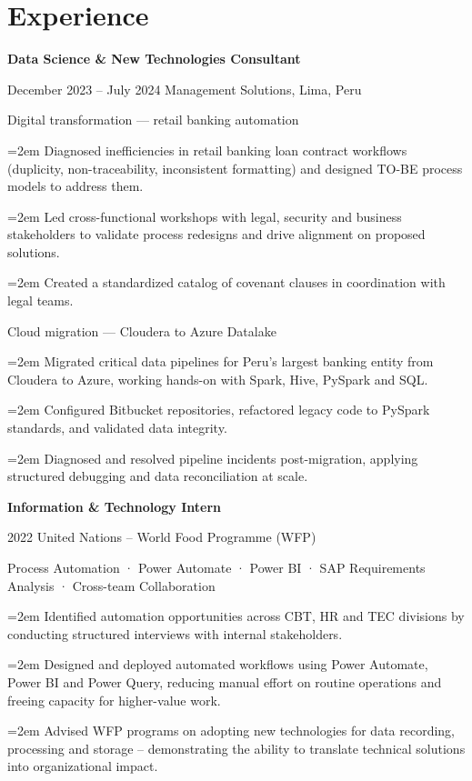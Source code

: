 \documentclass[]{friggeri-cv}
\newcommand{\experienceentry}[3]{%
    \par
    \Needspace{24\baselineskip}%
    \vspace{0.5em}%
    \noindent
    \textbf{#1}\par
    \noindent
    {\small #2}%
    \hspace{0.15em}%
    {\small\addfontfeature{Color=pblue}#3}\par
    \vspace{0.25em}%
}
\newcommand{\experienceproject}[1]{%
    \par
    \vspace{0.35em}%
    \noindent
    {\small #1}\par
    \vspace{0.05em}%
}
\newcommand{\cvbullet}[1]{%
    \par
    \noindent
    \small
    \hangindent=2em
    \hangafter=1
    \hspace{0.8em}\textbullet\hspace{0.6em}#1%
    \par
    \vspace{0.01em}%
}
\begin{document}

\section{Experience}
\experienceentry
    {Data Science \& New Technologies Consultant}
    {December 2023 -- July 2024}
    {Management Solutions, Lima, Peru}
\experienceproject
    {Digital transformation --- retail banking automation}
\cvbullet
    {Diagnosed inefficiencies in retail banking loan contract workflows (duplicity, non-traceability, inconsistent formatting) and designed TO-BE process models to address them.}
\cvbullet
    {Led cross-functional workshops with legal, security and business stakeholders to validate process redesigns and drive alignment on proposed solutions.}
\cvbullet
    {Created a standardized catalog of covenant clauses in coordination with legal teams.}
\experienceproject
    {Cloud migration --- Cloudera to Azure Datalake}
\cvbullet
    {Migrated critical data pipelines for Peru's largest banking entity from Cloudera to Azure, working hands-on with Spark, Hive, PySpark and SQL.}
\cvbullet
    {Configured Bitbucket repositories, refactored legacy code to PySpark standards, and validated data integrity.}
\cvbullet
    {Diagnosed and resolved pipeline incidents post-migration, applying structured debugging and data reconciliation at scale.}


\experienceentry
    {Information \& Technology Intern}
    {2022}
    {United Nations -- World Food Programme (WFP)}
\experienceproject
    {Process Automation · Power Automate · Power BI · SAP Requirements Analysis · Cross-team Collaboration}
\cvbullet
    {Identified automation opportunities across CBT, HR and TEC divisions by conducting structured interviews with internal stakeholders.}
\cvbullet
    {Designed and deployed automated workflows using Power Automate, Power BI and Power Query, reducing manual effort on routine operations and freeing capacity for higher-value work.}

\cvbullet
    {Advised WFP programs on adopting new technologies for data recording, processing and storage -- demonstrating the ability to translate technical solutions into organizational impact.}
\end{document}
